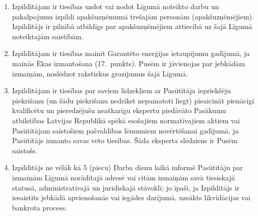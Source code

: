 \begin{multicols}{2}
\begin{enumerate}
	\item Izpildītājam ir tiesības uzdot vai nodot Līgumā noteikto darbu un pakalpojumu izpildi apakšuzņēmumā trešajām personām (apakšuzņēmējiem). Izpildītājs ir pilnībā atbildīgs par apakšuzņēmējiem attiecībā uz šajā Līgumā noteiktajām saistībām.
	\item Izpildītājam ir tiesības mainīt Garantēto enerģijas ietaupījumu gadījumā, ja mainās Ēkas izmantošana (17.\ punkts). Pusēm ir jāvienojas par jebkādām izmaiņām, noslēdzot rakstiskus grozījumus šajā Līgumā.
	\item Izpildītājam ir tiesības par saviem līdzekļiem ar Pasūtītāja iepriekšēju piekrišanu (un šādu piekrišanu nedrīkst nepamatoti liegt) pieaicināt pienācīgi kvalificētu un pieredzējušu neatkarīgu ekspertu piedāvāto Pasākumu atbilstības Latvijas Republikā spēkā esošajiem normatīvajiem aktiem vai Pasūtītājam saistošiem pašvaldības lēmumiem novērtēšanai gadījumā, ja Pasūtītājs izmanto savas veto tiesības. Šāda eksperta slēdziens ir Pusēm saistošs.
	\item Izpildītājs ne vēlāk kā 5 (piecu) Darba dienu laikā informē Pasūtītāju par izmaiņām Līgumā norādītajā adresē vai citām izmaiņām savā tiesiskajā statusā, administratīvajā un juridiskajā stāvoklī; jo īpaši, ja Izpildītājs ir iesaistīts jebkādā apvienošanās vai iegādes darījumā, uzsākts likvidācijas vai bankrota process.
\end{enumerate}


\end{multicols}
